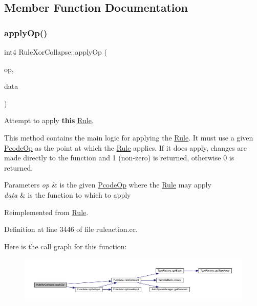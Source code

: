 \subsection{Member Function Documentation}
\mbox{\label{class_rule_xor_collapse_a66798e6a5cdb2306f61f2596db611045}} 
\subsubsection{\texorpdfstring{applyOp()}{applyOp()}}
{\footnotesize\ttfamily int4 Rule\+Xor\+Collapse\+::apply\+Op (\begin{DoxyParamCaption}\item[{\mbox{\hyperlink{class_pcode_op}{Pcode\+Op}} $\ast$}]{op,  }\item[{\mbox{\hyperlink{class_funcdata}{Funcdata}} \&}]{data }\end{DoxyParamCaption})\hspace{0.3cm}{\ttfamily [virtual]}}



Attempt to apply {\bfseries{this}} \mbox{\hyperlink{class_rule}{Rule}}. 

This method contains the main logic for applying the \mbox{\hyperlink{class_rule}{Rule}}. It must use a given \mbox{\hyperlink{class_pcode_op}{Pcode\+Op}} as the point at which the \mbox{\hyperlink{class_rule}{Rule}} applies. If it does apply, changes are made directly to the function and 1 (non-\/zero) is returned, otherwise 0 is returned. 
\begin{DoxyParams}{Parameters}
{\em op} & is the given \mbox{\hyperlink{class_pcode_op}{Pcode\+Op}} where the \mbox{\hyperlink{class_rule}{Rule}} may apply \\
\hline
{\em data} & is the function to which to apply \\
\hline
\end{DoxyParams}


Reimplemented from \mbox{\hyperlink{class_rule_a4e3e61f066670175009f60fb9dc60848}{Rule}}.



Definition at line 3446 of file ruleaction.\+cc.

Here is the call graph for this function\+:
\nopagebreak
\begin{figure}[H]
\begin{center}
\leavevmode
\includegraphics[width=350pt]{class_rule_xor_collapse_a66798e6a5cdb2306f61f2596db611045_cgraph}
\end{center}
\end{figure}
\mbox{\label{class_rule_xor_collapse_a48b66467d8d326b7c4da8f6eb3110970}} 
